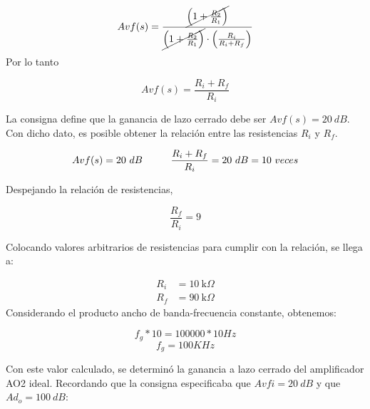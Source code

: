 \documentclass[a4paper,12pt]{article}
\begin{document}
\begin{equation}
    Avf(s) = \frac{\cancel{\left(1+\frac{R_2}{R_1}\right)}}{\cancel{\left(1+\frac{R_2}{R_1}\right)} \cdot \left(\frac{R_i}{R_i+R_f}\right)} 
\end{equation}
\vspace{0,2cm}
\hspace{1mm}Por lo tanto

\begin{equation}
    \boxed{Avf(s)=\frac{R_i+R_f}{R_i}}
\end{equation}

\vspace{0,2cm} 
\hspace{1mm}La consigna define que la ganancia de lazo cerrado debe ser $Avf(s)=20~dB$. Con dicho dato, es posible obtener la relación entre las resistencias $R_i$ y $R_f$.

\begin{equation}
    Avf(s)=20~dB \hspace{5mm}\hspace{5mm} \frac{R_i+R_f}{R_i}=20~dB = 10~veces
\end{equation}

\vspace{0,2cm}
\hspace{1mm}Despejando la relación de resistencias,

 
\begin{equation}
    \frac{R_f}{R_i} = 9
\end{equation}

\vspace{0,2cm}
\hspace{1mm}Colocando valores arbitrarios de resistencias para cumplir con la relaci\'on, se llega a:

\begin{align}
    R_i &= 10~\text{k}\Omega \\ 
    R_f &= 90~\text{k}\Omega
\end{align}
\vspace{0,2cm}
\hspace{1mm}Considerando el producto ancho de banda-frecuencia constante, obtenemos:

\begin{equation}
   f_g*10=100000*10Hz
\end{equation}
\begin{equation}
   f_g=100KHz
\end{equation}

\vspace{0,2cm}
\hspace{1mm}Con este valor calculado, se determin\'o la ganancia a lazo cerrado del amplificador AO2 ideal. Recordando que la consigna especificaba que $Avfi=20~dB$ y que $Ad_o=100~dB$:
\end{document}
